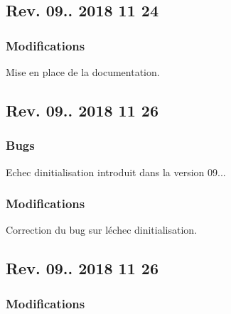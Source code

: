 \subsection*{Rev. 09.. 2018 11 24~\newline
}

\subsubsection*{Modifications}


\begin{DoxyItemize}
\item Mise en place de la documentation.
\end{DoxyItemize}

\subsection*{Rev. 09.. 2018 11 26~\newline
}

\subsubsection*{Bugs}


\begin{DoxyItemize}
\item Echec d\textquotesingle{}initialisation introduit dans la version 09...
\end{DoxyItemize}

\subsubsection*{Modifications}


\begin{DoxyItemize}
\item Correction du bug sur l\textquotesingle{}échec d\textquotesingle{}initialisation.
\end{DoxyItemize}

\subsection*{Rev. 09.. 2018 11 26~\newline
}

\subsubsection*{Modifications}



